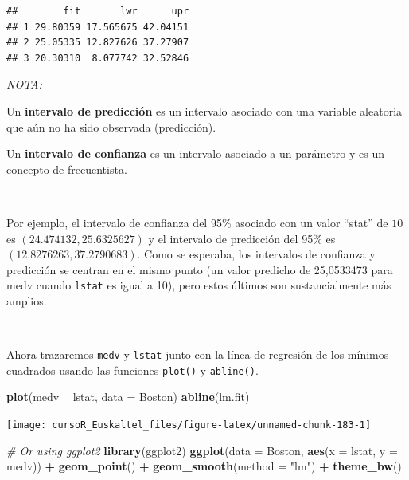 \documentclass[]{book}
\newenvironment{Shaded}{\begin{snugshade}}{\end{snugshade}}
\newcommand{\KeywordTok}[1]{\textcolor[rgb]{0.13,0.29,0.53}{\textbf{#1}}}
\newcommand{\DataTypeTok}[1]{\textcolor[rgb]{0.13,0.29,0.53}{#1}}
\newcommand{\StringTok}[1]{\textcolor[rgb]{0.31,0.60,0.02}{#1}}
\newcommand{\CommentTok}[1]{\textcolor[rgb]{0.56,0.35,0.01}{\textit{#1}}}
\newcommand{\OperatorTok}[1]{\textcolor[rgb]{0.81,0.36,0.00}{\textbf{#1}}}
\newcommand{\NormalTok}[1]{#1}
\begin{document}
\begin{verbatim}
##        fit       lwr      upr
## 1 29.80359 17.565675 42.04151
## 2 25.05335 12.827626 37.27907
## 3 20.30310  8.077742 32.52846
\end{verbatim}

\emph{NOTA:}

Un \textbf{intervalo de predicción} es un intervalo asociado con una
variable aleatoria que aún no ha sido observada (predicción).

Un \textbf{intervalo de confianza} es un intervalo asociado a un
parámetro y es un concepto de frecuentista.

~

Por ejemplo, el intervalo de confianza del 95\% asociado con un valor
``stat'' de \(10\) es \((24.474132, 25.6325627)\) y el intervalo de
predicción del 95\% es \((12.8276263, 37.2790683)\). Como se esperaba,
los intervalos de confianza y predicción se centran en el mismo punto
(un valor predicho de 25,0533473 para medv cuando \texttt{lstat} es
igual a 10), pero estos últimos son sustancialmente más amplios.

~

Ahora trazaremos \texttt{medv} y \texttt{lstat} junto con la línea de
regresión de los mínimos cuadrados usando las funciones \texttt{plot()}
y \texttt{abline()}.

\begin{Shaded}
\begin{Highlighting}[]
\KeywordTok{plot}\NormalTok{(medv }\OperatorTok{~}\StringTok{ }\NormalTok{lstat, }\DataTypeTok{data =}\NormalTok{ Boston)}
\KeywordTok{abline}\NormalTok{(lm.fit)}
\end{Highlighting}
\end{Shaded}

\begin{center}\texttt{[image: cursoR\_Euskaltel\_files/figure-latex/unnamed-chunk-183-1]} \end{center}

\begin{Shaded}
\begin{Highlighting}[]
\CommentTok{# Or using ggplot2}
\KeywordTok{library}\NormalTok{(ggplot2)}
\KeywordTok{ggplot}\NormalTok{(}\DataTypeTok{data =}\NormalTok{ Boston, }\KeywordTok{aes}\NormalTok{(}\DataTypeTok{x =}\NormalTok{ lstat, }\DataTypeTok{y =}\NormalTok{ medv)) }\OperatorTok{+}
\StringTok{  }\KeywordTok{geom_point}\NormalTok{() }\OperatorTok{+}\StringTok{ }
\StringTok{  }\KeywordTok{geom_smooth}\NormalTok{(}\DataTypeTok{method =} \StringTok{"lm"}\NormalTok{) }\OperatorTok{+}\StringTok{ }
\StringTok{  }\KeywordTok{theme_bw}\NormalTok{()}
\end{Highlighting}
\end{Shaded}
\end{document}
